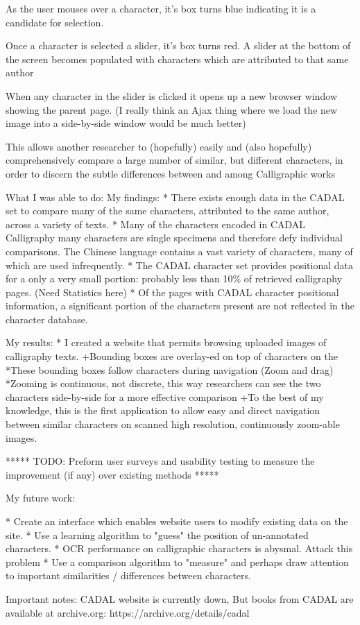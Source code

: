                 As the user mouses over a character, it's box turns blue indicating it is a candidate for selection.
                
                Once a character is selected a slider, it's box turns red. A slider at the bottom of the screen becomes populated with characters which are attributed to that same author
                
                When any character in the slider is clicked it opens up a new browser window showing the parent page.  (I really think an Ajax thing where we load the new image into a side-by-side window would be much better)
                
                This allows another researcher to (hopefully) easily and (also hopefully) comprehensively compare a large number of similar, but different characters, in order to discern the subtle differences between and among Calligraphic works
                

What I was able to do:
    My findings:
        * There exists enough data in the CADAL set to compare many of the same characters, attributed to the same author, across a variety of texts.
        *  Many of the characters encoded in CADAL Calligraphy many characters are single specimens and therefore defy individual comparisons.  The Chinese language contains a vast variety of characters, many of which are used infrequently.
        *  The CADAL character set provides positional data for a only a very small portion: probably less than 10\% of retrieved calligraphy pages.  (Need Statistics here)
        *  Of the pages with CADAL character positional information, a significant portion of the characters present are not reflected in the character database.
    
    My results:
        *  I created a website that permits browsing uploaded images of calligraphy texts.
            +Bounding boxes are overlay-ed on top of characters on the 
                *These bounding boxes follow characters during navigation (Zoom and drag)
                *Zooming is continuous, not discrete, this way researchers can see the two characters side-by-side for a more effective comparison
            +To the best of my knowledge, this is the first application to allow easy and direct navigation between similar characters on scanned high resolution, continuously zoom-able images.

        ***** TODO: Preform user surveys and usability testing to measure the improvement (if any) over existing methods *****

    My future work:
        
        *  Create an interface which enables website users to modify existing data on the site.
        *  Use a learning algorithm to "guess" the position of un-annotated characters.
        *  OCR performance on calligraphic characters is abysmal.  Attack this problem
        *  Use a comparison algorithm to "measure" and perhaps draw attention to important similarities / differences between characters.



Important notes:
CADAL website is currently down,
But books from CADAL are available at archive.org: https://archive.org/details/cadal


